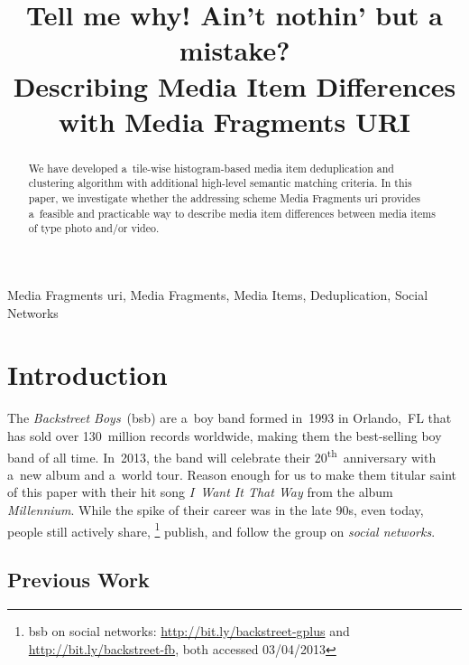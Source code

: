 \documentclass{article}
\begin{document}
\sloppy

\newcommand{\ts}{\textsuperscript}

\title{Tell me why! Ain't nothin' but a mistake?\\ Describing Media Item Differences with Media Fragments URI}
%
\address{}

\maketitle

%
\begin{abstract}
We have developed a~tile-wise histogram-based
media item deduplication and clustering algorithm
with additional high-level semantic matching criteria.
In this paper, we investigate whether the addressing scheme
Media Fragments  {\sc uri} provides a~feasible and practicable way
to describe media item differences
between media items of type photo and/or video.
\end{abstract}
%
\begin{keywords}
Media Fragments {\sc uri}, Media Fragments, Media Items, Deduplication, Social Networks
\end{keywords}
%
\section{Introduction}
\label{sec:introduction}

The \emph{Backstreet Boys}~({\sc bsb}) are a~boy band
formed in~1993 in Orlando,~FL
that has sold over 130~million records worldwide,
making them the best-selling boy band of all time.
In~2013, the band will celebrate their 20\ts{th}~anniversary
with a~new album and a~world tour.
Reason enough for us to make them titular saint of this paper
with their hit song \emph{I~Want It That Way}
from the album \emph{Millennium}.
While the spike of their career was in the late 90s,
even today, people still actively share,%
\footnote{{\sc bsb} on social networks: \url{http://bit.ly/backstreet-gplus}
and \url{http://bit.ly/backstreet-fb},
both accessed 03/04/2013}
publish, and follow the group on \emph{social networks}.

\subsection{Previous Work}
\label{sec:previous-work}
\end{document}
